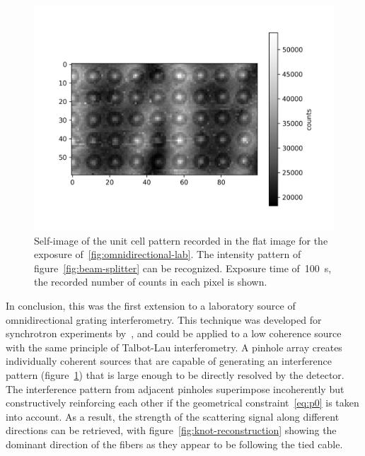 \begin{figure}[htb]
    \centering
    \includegraphics[width=\textwidth]{gfx/omnidirectional/visibility-omnidirectional.png}
    \caption{Self-image of the unit cell pattern recorded in the flat image
        for the exposure of~\ref{fig:omnidirectional-lab}. The intensity
        pattern of figure~\ref{fig:beam-splitter} can be recognized.
        Exposure time of~\SI{100}{\second}, the recorded number of counts in
    each pixel is shown.}
    \label{fig:cells}
\end{figure}

In conclusion, this was the first extension to a laboratory source of
omnidirectional grating interferometry. This technique was developed for
synchrotron experiments by~\cite{PhysRevLett.116.093902}, and could be
applied to a low coherence source with the same principle of Talbot-Lau
interferometry. A pinhole array creates individually coherent sources that
are capable of generating an interference pattern (figure~\ref{fig:cells})
that is large enough to be directly resolved by the detector. The
interference pattern from adjacent pinholes superimpose incoherently but
constructively reinforcing each other if the geometrical
constraint~\eqref{eq:p0} is taken into account. As a result, the strength of
the scattering signal along different directions can be retrieved, with
figure~\ref{fig:knot-reconstruction} showing the dominant direction of the
fibers as they appear to be following the tied cable.
